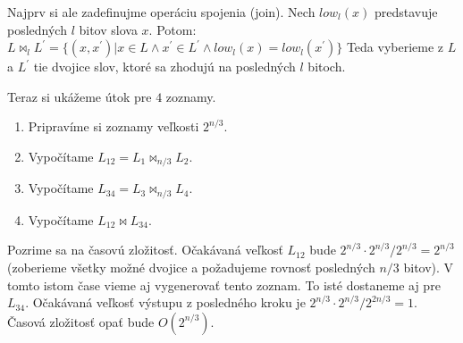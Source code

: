 Najprv si ale zadefinujme operáciu spojenia (join). Nech $low_l(x)$ predstavuje
posledných $l$ bitov slova $x$. Potom:
$L \bowtie_l L^{'} = \{(x, x^{'}) | x \in L \land x^{'} \in L^{'} \land low_{l}(x) = low_l(x^{'})\}$
Teda vyberieme z $L$ a $L^{'}$ tie dvojice slov, ktoré sa zhodujú na posledných
$l$ bitoch.

Teraz si ukážeme útok pre $4$ zoznamy. 
\begin{enumerate}
\item Pripravíme si zoznamy veľkosti $2^{n/3}$.
\item Vypočítame $L_{12} = L_1 \bowtie_{n/3} L_2$.
\item Vypočítame $L_{34} = L_3 \bowtie_{n/3} L_4$.
\item Vypočítame $L_{12} \bowtie L_{34}$.
\end{enumerate}

Pozrime sa na časovú zložitosť. Očakávaná veľkosť $L_{12}$ bude $2^{n/3} \cdot 2^{n/3} / 2^{n/3} = 2^{n/3}$ (zoberieme všetky možné
dvojice a požadujeme rovnosť posledných $n/3$ bitov). V tomto istom čase vieme aj vygenerovať tento zoznam. To isté
dostaneme aj pre $L_{34}$. Očakávaná veľkosť výstupu z posledného kroku je $2^{n/3} \cdot 2^{n/3} / 2^{2n/3} = 1$.
Časová zložitosť opať bude $O(2^{n/3})$.


